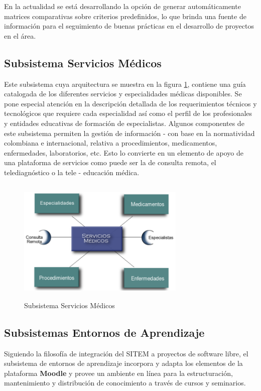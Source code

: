 En la actualidad se está desarrollando la opción de generar automáticamente matrices comparativas sobre criterios predefinidos, lo que brinda una fuente de información para el seguimiento de buenas prácticas en el desarrollo de proyectos en el área.

\subsection{Subsistema Servicios Médicos} 
Este subsistema cuya arquitectura se muestra en la figura \ref{servicios}, contiene una guía catalogada de los diferentes servicios y especialidades médicas disponibles. Se pone especial atención en la descripción detallada de los requerimientos técnicos y tecnológicos que requiere cada especialidad así como el perfil de los profesionales y entidades educativas de formación de especialistas. Algunos componentes de este subsistema permiten la gestión de información - con base en la normatividad colombiana e internacional, relativa a procedimientos, medicamentos, enfermedades, laboratorios, etc. Esto lo convierte en un elemento de apoyo de una plataforma de servicios como puede ser la de consulta remota, el telediagnóstico o la tele - educación médica.

\begin{figure}
 \centering
 \includegraphics[width=80mm, height=60mm]{servicios.png}
 \caption{Subsistema Servicios Médicos}
 \label{servicios}
\end{figure}

\subsection{Subsistemas Entornos de Aprendizaje} 
Siguiendo la filosofía de integración del SITEM a proyectos de software libre, el subsistema de entornos de aprendizaje incorpora y adapta los elementos de la plataforma \textbf{Moodle} y provee un ambiente en línea para la estructuración, mantenimiento y distribución de conocimiento a través de cursos y seminarios. 

